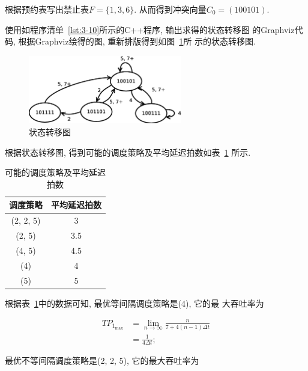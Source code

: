 \begin{solve}
  根据预约表写出禁止表$F = \{1, 3, 6\}$. 从而得到冲突向量$C_0 =
  (100101)$.
  
  使用如程序清单~\ref{lst:3-10}所示的C++程序, 输出求得的状态转移图
  的Graphviz代码, 根据Graphviz绘得的图, 重新排版得到如图~\ref{fig:3-10}所
  示的状态转移图.

  \begin{figure}[!h]
    \centering
    \includegraphics[width=0.6\textwidth]{img/3-10.eps}
    \caption{状态转移图}
    \label{fig:3-10}
  \end{figure}
  
  

  根据状态转移图, 得到可能的调度策略及平均延迟拍数如表~\ref{tab:3-10}
  所示.

  \begin{table}[!h]
    \centering
    \begin{tabular}{cc}
      \toprule
      调度策略 & 平均延迟拍数 \\ \midrule
      (2, 2, 5) & 3 \\
      (2, 5) & 3.5 \\
      (4, 5) & 4.5 \\
      (4) & 4 \\
      (5) & 5 \\ \bottomrule
      
    \end{tabular}
    \caption{可能的调度策略及平均延迟拍数}
    \label{tab:3-10}
  \end{table}

  根据表~\ref{tab:3-10}中的数据可知, 最优等间隔调度策略是(4), 它的最
  大吞吐率为
  
  \begin{align*}
    TP_{1_{\mathrm{max}}} &=
    \lim_{n\rightarrow{}\infty}{\frac{n}{7+4(n-1)\Delta{}t}}\\
    &=\frac{1}{4\Delta{}t};
  \end{align*}

  最优不等间隔调度策略是(2, 2, 5), 它的最大吞吐率为


\end{solve}
